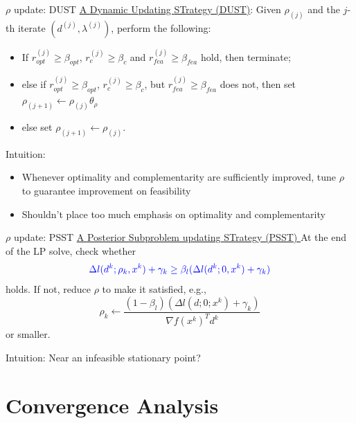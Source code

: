 \documentclass[8pt]{beamer}
\begin{document}
	\begin{frame}{$\rho$ update:  DUST} 
		\underline{ A {\blue D}ynamic {\blue U}pdating {\blue ST}rategy (DUST)}: 
		\vfill 
		Given $\rho_{(j)}$ and the $j$-th iterate $(d^{(j)}, \lambda^{(j)})$, perform the following:
		\begin{itemize}
			\item  If $r_{{opt}}^{(j)} \ge \beta_{opt}$, $r_c^{(j)} \ge \beta_c$ and $r_{fea}^{(j)} \ge \beta_{fea}$ hold, then terminate; 
			\item  else if $r_{{opt}}^{(j)} \ge \beta_{opt}$, $r_c^{(j)} \ge \beta_c$, but $r_{fea}^{(j)} \ge \beta_{fea}$ does not, then set $\rho_{(j+1)} \gets \rho_{(j)}\theta_\rho$
			\item else set $\rho_{(j+1)} \gets \rho_{(j)}$.
		\end{itemize}
		\vfill
		{\blue \leftpointright Intuition:}  
		\begin{itemize}
			\item Whenever optimality and complementarity are sufficiently improved,  tune  $\rho$ to guarantee improvement on feasibility 
			\item Shouldn't place too much emphasis on optimality and complementarity
		\end{itemize}
	\end{frame}

	\begin{frame}{$\rho$ update:  PSST} 
		\underline{ A {\blue P}osterior {\blue S}ubproblem updating {\blue ST}rategy (PSST) }
		\vfill
		At the end of the LP solve, check whether 
		$${\color{blue}   \Delta l(d^k; \rho_k, x^k) +  \gamma_k \geq \beta_l (\Delta l(d^k; 0, x^k)+ \gamma_k) }$$
		holds.  If not, reduce $\rho$ to make it satisfied, e.g., 
		\[ \rho_k \gets \frac{(1-\beta_l)( \Delta l(d; 0;x^k)+\gamma_k) }{ \nabla f(x^k)^Td^k  } \]
			or smaller. 

		\vfill
		{\blue 	\leftpointright Intuition:}  Near an infeasible stationary point?
	\end{frame}

\section[Convergence Analysis]{Convergence Analysis}
\end{document}
